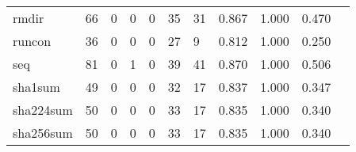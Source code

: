 \begin{longtable}{lp{1.2cm}p{1.2cm}p{1.2cm}p{1.2cm}p{1.2cm}p{1.2cm}p{1.2cm}p{1.2cm}p{1.2cm}p{1.2cm}}
rmdir     &                                    66 &                                                  0 &                                                  0 &                                                  0 &                                                 35 &                                                 31 &                                              0.867 &                                              1.000 &                                              0.470 \\
runcon    &                                    36 &                                                  0 &                                                  0 &                                                  0 &                                                 27 &                                                  9 &                                              0.812 &                                              1.000 &                                              0.250 \\
seq       &                                    81 &                                                  0 &                                                  1 &                                                  0 &                                                 39 &                                                 41 &                                              0.870 &                                              1.000 &                                              0.506 \\
sha1sum   &                                    49 &                                                  0 &                                                  0 &                                                  0 &                                                 32 &                                                 17 &                                              0.837 &                                              1.000 &                                              0.347 \\
sha224sum &                                    50 &                                                  0 &                                                  0 &                                                  0 &                                                 33 &                                                 17 &                                              0.835 &                                              1.000 &                                              0.340 \\
sha256sum &                                    50 &                                                  0 &                                                  0 &                                                  0 &                                                 33 &                                                 17 &                                              0.835 &                                              1.000 &                                              0.340 \\

\end{longtable}
